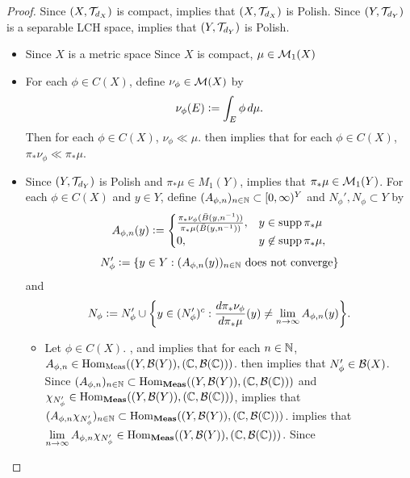 \documentclass{book}
\begin{document}
\begin{proof}
	Since $(X, \mathcal{T}_{d_X})$ is compact,  implies that $(X, \mathcal{T}_{d_X})$ is Polish. Since $(Y, \mathcal{T}_{d_Y})$ is a separable LCH space,  implies that $(Y, \mathcal{T}_{d_Y})$ is Polish.
	\begin{itemize}
		\item Since $X$ is a metric space Since $X$ is compact, $\mu \in \mathcal{M}_1(X)$
		\item For each $\phi \in C(X)$, define $\nu_{\phi} \in \mathcal{M}(X)$ by 
		$$\nu_{\phi}(E) \vcentcolon= \int_E \phi \, d \mu.$$
		Then for each $\phi \in C(X)$, $\nu_{\phi} \ll \mu$.  then implies that for each $\phi \in C(X)$, $\pi_*\nu_{\phi} \ll \pi_*\mu$. 
		\item Since $(Y, \mathcal{T}_{d_Y})$ is Polish and $\pi_*\mu \in M_1(Y)$,  implies that $\pi_*\mu \in \mathcal{M}_1(Y)$. For each $\phi \in C(X)$ and $y \in Y$, define $(A_{\phi, n})_{n \in \mathbb{N}} \subset [0,\infty)^Y$ and $N_{\phi}', N_{\phi} \subset Y$ by 
		\[
		A_{\phi, n}(y) \vcentcolon= 
		\begin{cases}
			\frac{\pi_*\nu_{\phi}(\bar{B}(y, n^{-1}))}{\pi_*\mu(\bar{B}(y, n^{-1}))}, & y \in \operatorname{supp} \pi_*\mu \\
			0, & y \not \in \operatorname{supp} \pi_*\mu,
		\end{cases}
		\]
		$$N_{\phi}' \vcentcolon= \{y \in Y: \text{$(A_{\phi, n}(y))_{n \in \mathbb{N}}$ does not converge}\}$$ 
		and 
		$$N_{\phi} \vcentcolon= N_{\phi}' \cup \bigg\{ y \in (N_{\phi}')^c:  \frac{d\pi_*\nu_{\phi}}{d\pi_*\mu}(y) \neq \lim \limits_{n \rightarrow \infty} A_{\phi,n}(y) \bigg\}.$$
		\begin{itemize}
			\item Let $\phi \in C(X)$.  ,  and \rex{}  implies that for each $n \in \mathbb{N}$, $A_{\phi, n} \in \operatorname{Hom}_{\operatorname{\text{Meas}}}((Y, \mathcal{B}(Y)), (\mathbb{C}, \mathcal{B}(\mathbb{C})))$.  then implies that $N_{\phi}' \in \mathcal{B}(X)$. Since $(A_{\phi,n})_{n \in \mathbb{N}} \subset \operatorname{Hom}_{\operatorname{\text{\textbf{Meas}}}}((Y, \mathcal{B}(Y)), (\mathbb{C}, \mathcal{B}(\mathbb{C})))$ and $\chi_{N_{\phi}'} \in \operatorname{Hom}_{\operatorname{\text{\textbf{Meas}}}}((Y, \mathcal{B}(Y)), (\mathbb{C}, \mathcal{B}(\mathbb{C})))$,  implies that $(A_{\phi,n} \chi_{N_{\phi}'})_{n \in \mathbb{N}} \subset \operatorname{Hom}_{\operatorname{\text{\textbf{Meas}}}}((Y, \mathcal{B}(Y)), (\mathbb{C}, \mathcal{B}(\mathbb{C})))$. \rex{}  implies that $\lim \limits_{n \rightarrow \infty} A_{\phi,n}\chi_{N_{\phi}'} \in \operatorname{Hom}_{\operatorname{\text{\textbf{Meas}}}}((Y, \mathcal{B}(Y)), (\mathbb{C}, \mathcal{B}(\mathbb{C})))$. Since 

\end{itemize}
\end{itemize}
\end{proof}
\end{document}
